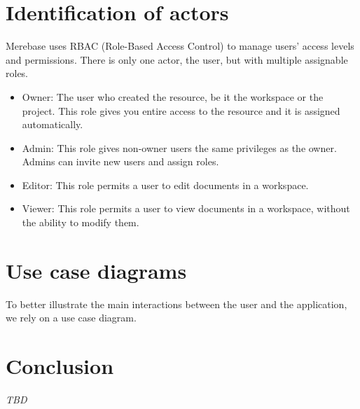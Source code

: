 \section{Identification of actors}

Merebase uses RBAC (Role-Based Access Control) to manage users' access
levels and permissions. There is only one actor, the user, but with
multiple assignable roles.

\begin{itemize}
	\item
	      Owner: The user who created the resource, be it the workspace or the
	      project. This role gives you entire access to the resource and it is
	      assigned automatically.
	\item
	      Admin: This role gives non-owner users the same privileges as the
	      owner. Admins can invite new users and assign roles.
	\item
	      Editor: This role permits a user to edit documents in a workspace.
	\item
	      Viewer: This role permits a user to view documents in a workspace,
	      without the ability to modify them.
\end{itemize}

\section{Use case diagrams}

To better illustrate the main interactions between the user and the
application, we rely on a use case diagram.



\section{Conclusion}

\emph{TBD}